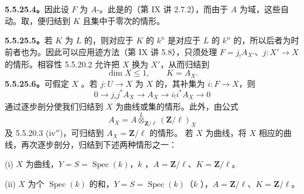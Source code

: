 \textbf{5.5.25.4。}因此设 $F$ 为 $A$-。此是的（第 IX 讲 2.7.2），而由于 $A$ 为域，这些自动。取，便归结到 $K$ 且集中于零次的情形。

\textbf{5.5.25.5。}若 $K$ 为 $L$ 的，则对应于 $K$ 的 $k^n$ 是对应于 $L$ 的 $k^n$ 的，所以后者为时前者也为。因此可以应用迹方法（第 IX 讲 5.8），只须处理 $F=j_!A_{X'}$、$j:X'\to X$ 的情形。相容性 5.5.20.2 允许把 $X$ 换为 $X'$，从而归结到
\[\dim X\leq1,\qquad K=A_X.\]
\textbf{5.5.25.6。}可假定 $X$ 。若 $j:U\to X$ 为 $X$ 的，其补集为 $i:F\to X$，则
\[0\longrightarrow j_!j^*A_X\longrightarrow A_X\longrightarrow i_!i^*A_X\longrightarrow0\]
通过逐步剖分使我们归结到 $X$ 为曲线或集的情形。此外，由公式
\[A_X=A\overset L\otimes_{\mathbf Z/\ell}(\mathbf Z/\ell)_X\]
及 5.5.20.3 (iv$''$)，可归结到 $A_X=\mathbf Z/\ell$ 的情形。
若 $X$ 为曲线，将 $X$ 相应的曲线，再次逐步剖分，归结到下述两种情形之一：

(i) $X$ 为曲线，$Y=S=\operatorname{Spec}(k)$，$k$ ，$A=\mathbf Z/\ell$、$K=\mathbf Z/\ell$。

(ii) $X$ 为个 $\operatorname{Spec}(k)$ 的和，$Y=S=\operatorname{Spec}(k)$（$k$ ），$A=\mathbf Z/\ell$、$K=\mathbf Z/\ell$。

